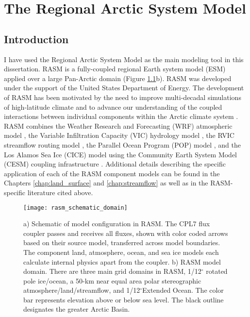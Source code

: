 
\chapter{The Regional Arctic System Model}
\label{chap:rasm}

\section{Introduction}

I have used the Regional Arctic System Model as the main modeling tool in this dissertation.
RASM is a fully-coupled regional Earth system model (ESM) applied over a large Pan-Arctic domain (Figure \ref{fig:rasm}b).
RASM was developed under the support of the United States Department of Energy.
The development of RASM has been motivated by the need to improve multi-decadal simulations of high-latitude climate and to advance our understanding of the coupled interactions between individual components within the Arctic climate system \citep{Roberts_2010}.
RASM combines the Weather Research and Forecasting (WRF) atmospheric model \citep{Skamarock_2008,DuVivier_2016,Cassano_2016}, the Variable Infiltration Capacity (VIC) hydrology model \citep{Liang_1994,Liang_1996,Hamman_2016a}, the RVIC streamflow routing model \citep{Lohmann_1996,Hamman_2016b}, the Parallel Ocean Program (POP) model \citep{Smith_2010,Roberts_2015a}, and the Los Alamos Sea Ice (CICE) model \citep{Hunke2013,Hunke2015,Roberts_2015a} using the Community Earth System Model (CESM) coupling infrastructure \citep[CPL7; ][]{Craig_2012,Roberts_2015a}.
Additional details describing the specific application of each of the RASM component models can be found in the Chapters \ref{chap:land_surface} and \ref{chap:streamflow} as well as in the RASM-specific literature cited above.

\begin{figure}
  \centering
  \texttt{[image: rasm\_schematic\_domain]}
  \caption{a) Schematic of model configuration in RASM.
  The CPL7 flux coupler passes and receives all fluxes, shown with color coded arrows based on their source model, transferred across model boundaries.
  The component land, atmosphere, ocean, and sea ice models each calculate internal physics apart from the coupler.
  b) RASM model domain.
  There are three main grid domains in RASM, 1/12$^{\circ}$ rotated pole ice/ocean, a 50-km near equal area polar stereographic atmosphere/land/streamflow, and 1/12$^{\circ}$Extended Ocean.
  The color bar represents elevation above or below sea level.
  The black outline designates the greater Arctic Basin.}
  \label{fig:rasm}
\end{figure}

